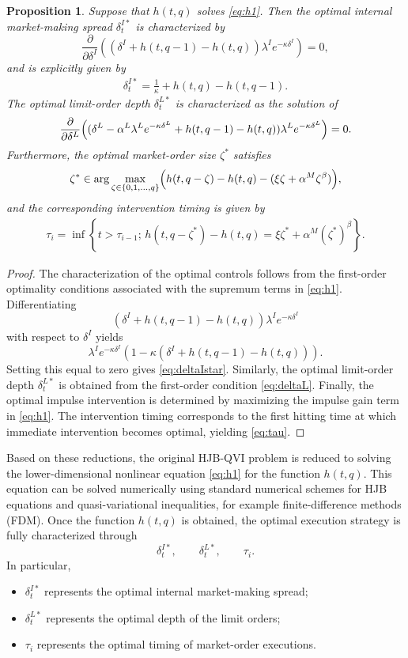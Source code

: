 \documentclass[12pt]{article}
\newtheorem{proposition}[thm]{Proposition}
\begin{document}
\begin{proposition}
\label{prop:optimal_controls}
Suppose that $h(t,q)$ solves \eqref{eq:h1}.
Then the optimal internal market-making spread
$\delta^{I*}_t$
is characterized by
\[
\frac{\partial}{\partial\delta^I}
\left(
(\delta^I+h(t,q-1)-h(t,q))
\lambda^I e^{-\kappa\delta^I}
\right)
=
0,
\]
and is explicitly given by
\begin{align}
\delta^{I*}_t
=
\frac{1}{\kappa}
+h(t,q)-h(t,q-1).
\label{eq:deltaIstar}
\end{align}
The optimal limit-order depth
$\delta^{L*}_t$
is characterized as the solution of
\begin{align}
\frac{\partial}{\partial\delta^L}
\Bigl(
(\delta^L
-\alpha^L\lambda^L e^{-\kappa\delta^L}
+h(t,q-1)-h(t,q))
\lambda^L e^{-\kappa\delta^L}
\Bigr)
=
0.
\label{eq:deltaL}
\end{align}
Furthermore, the optimal market-order size
$\zeta^*$
satisfies
\[
\zeta^*
\in
\arg\max_{\zeta\in\{0,1,\ldots,q\}}
\Bigl(
h(t,q-\zeta)-h(t,q)
-(\xi\zeta+\alpha^M\zeta^\beta)
\Bigr),
\]
and the corresponding intervention timing is given by
\begin{align}
\tau_i
=
\inf
\left\{
t>\tau_{i-1};
\,
h(t,q-\zeta^*)
-h(t,q)
=
\xi\zeta^*
+\alpha^M(\zeta^*)^\beta
\right\}.
\label{eq:tau}
\end{align}
\end{proposition}

\begin{proof}
The characterization of the optimal controls follows from the first-order optimality conditions associated with the supremum terms in \eqref{eq:h1}.
Differentiating
\[
(\delta^I+h(t,q-1)-h(t,q))
\lambda^I e^{-\kappa\delta^I}
\]
with respect to $\delta^I$
yields
\[
\lambda^I e^{-\kappa\delta^I}
\left(
1
-
\kappa
(\delta^I+h(t,q-1)-h(t,q))
\right).
\]
Setting this equal to zero gives
\eqref{eq:deltaIstar}.
Similarly,
the optimal limit-order depth
$\delta^{L*}_t$
is obtained from the first-order condition
\eqref{eq:deltaL}.
Finally,
the optimal impulse intervention is determined by maximizing the impulse gain term in \eqref{eq:h1}.
The intervention timing corresponds to the first hitting time at which immediate intervention becomes optimal, yielding \eqref{eq:tau}.
\end{proof}
Based on these reductions,
the original HJB-QVI problem is reduced to solving the lower-dimensional nonlinear equation
\eqref{eq:h1}
for the function $h(t,q)$.
This equation can be solved numerically using standard numerical schemes for HJB equations and quasi-variational inequalities,
for example finite-difference methods (FDM).
Once the function $h(t,q)$ is obtained,
the optimal execution strategy is fully characterized through
\[
\delta^{I*}_t,
\qquad
\delta^{L*}_t,
\qquad
\tau_i.
\]
In particular,
\begin{itemize}
  \item $\delta^{I*}_t$ represents the optimal internal market-making spread;
  \item $\delta^{L*}_t$ represents the optimal depth of the limit orders;
  \item $\tau_i$ represents the optimal timing of market-order executions.
\end{itemize}
\end{document}
